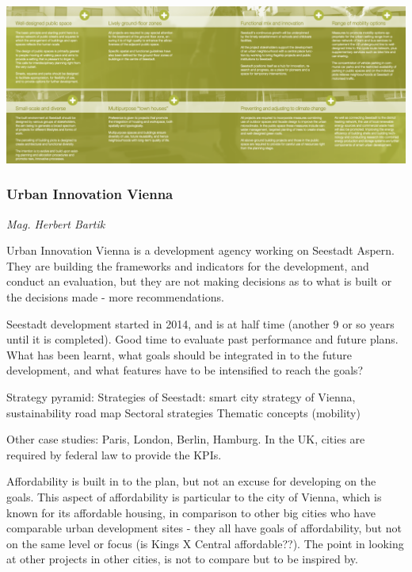 \documentclass{article}
\newcommand{\alignedmarginpar}[1]{%
        \marginpar{\raggedright\small #1}
    }
\begin{document}
\includegraphics[width=\textwidth]{seestadt_quality_criteria}

\subsubsection{Urban Innovation Vienna}

\textit{Mag. Herbert Bartik}

Urban Innovation Vienna is a development agency working on Seestadt Aspern. They are building the frameworks and indicators for the development, and conduct an evaluation, but they are not making decisions as to what is built or the decisions made - more recommendations.

Seestadt development started in 2014, and is at half time (another 9 or so years until it is completed). Good time to evaluate past performance and future plans. What has been learnt, what goals should be integrated in to the future development, and what features have to be intensified to reach the goals?

\begin{outline}
	\1 Strategy pyramid:
		\2 Strategies of Seestadt: smart city strategy of Vienna, sustainability road map
		\2 Sectoral strategies
		\2 Thematic concepts (mobility)
\end{outline}

Other case studies: Paris, London, Berlin, Hamburg. In the UK, cities are required by federal law to provide the KPIs.\alignedmarginpar{Kings X Central}

Affordability is built in to the plan, but not an excuse for developing on the goals. This aspect of affordability is particular to the city of Vienna, which is known for its affordable housing, in comparison to other big cities who have comparable urban development sites - they all have goals of affordability, but not on the same level or focus (is Kings X Central affordable??). The point in looking at other projects in other cities, is not to compare but to be inspired by. 
\end{document}
